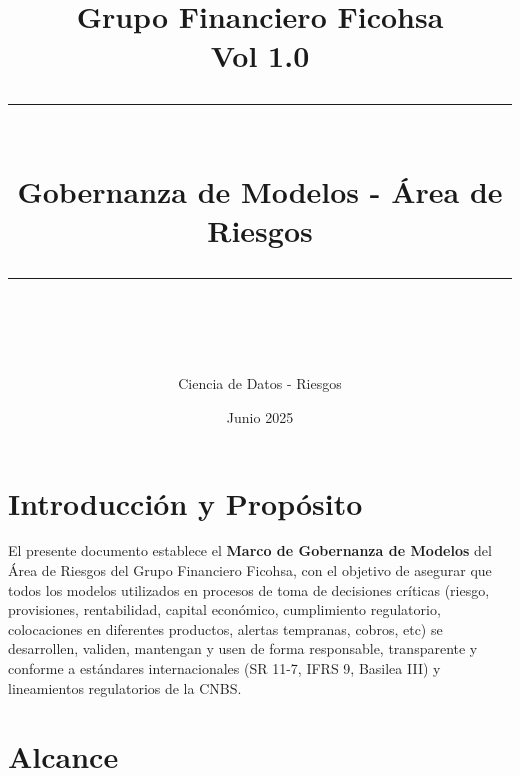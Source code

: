 \documentclass[11pt,oneside]{article}%
\newcommand{\HRule}[1]{\rule{\linewidth}{#1}}
\begin{document}
\title{ \normalsize Grupo Financiero Ficohsa \\
		Vol 1.0
		\\ [2.0cm]
		\HRule{0.5pt} \\
		\LARGE \textbf{Gobernanza de Modelos - Área de Riesgos} %
		\HRule{2pt} \\ [0.1cm]
		\normalsize  \vspace*{5\baselineskip}}

\date{Junio 2025}

\author{Ciencia de Datos - Riesgos}
\maketitle

\newpage
\tableofcontents
\newpage

\section{Introducción y Propósito}

El presente documento establece el \textbf{Marco de Gobernanza de Modelos} del Área de Riesgos del Grupo Financiero Ficohsa, con el objetivo de asegurar que todos los modelos utilizados en procesos de toma de decisiones críticas (riesgo, provisiones, rentabilidad, capital económico, cumplimiento regulatorio, colocaciones en diferentes productos, alertas tempranas, cobros, etc) se desarrollen, validen, mantengan y usen de forma responsable, transparente y conforme a estándares internacionales (SR 11-7, IFRS 9, Basilea III) y lineamientos regulatorios de la CNBS. 

\section{Alcance} 
\end{document}
